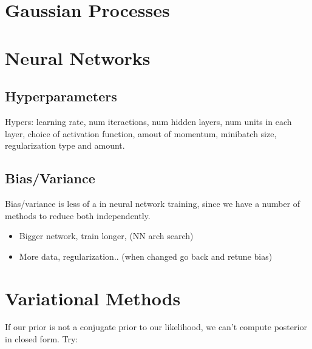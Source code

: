 \documentclass[11pt]{article}
\begin{document}
\section{Gaussian Processes}
\label{sec:gp}



\section{Neural Networks}
\label{sec:nn}

\subsection{Hyperparameters}
Hypers: learning rate, num iteractions, num hidden layers, num units in each layer,
choice of activation function, amout of momentum, minibatch size, regularization type
and amount.

\subsection{Bias/Variance}

Bias/variance is less of a  in neural network training, since we have a
number of methods to reduce both independently.
\begin{itemize}
  \item {} Bigger network, train longer, (NN arch
  search)
  \item {} More data, regularization.. (when changed
  go back and retune bias)
\end{itemize}


\section{Variational Methods}
\label{sec:var_meth}

If our prior is not a conjugate prior to our likelihood, we can't compute posterior in
closed form. Try:
\end{document}
